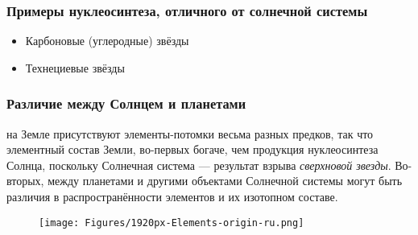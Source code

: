 \begin{frame}
\frametitle{Примеры нуклеосинтеза, отличного от солнечной системы}

\begin{itemize}
    \item Карбоновые (углеродные) звёзды
    \item Технециевые звёзды
\end{itemize}



\end{frame}

\begin{frame}
\frametitle{Различие между  Солнцем и планетами}
{\footnotesize
 на Земле присутствуют элементы-потомки весьма разных предков, так что элементный состав Земли, во-первых богаче, чем продукция нуклеосинтеза Солнца, поскольку Солнечная система --- результат взрыва \emph{сверхновой звезды}. 	Во-вторых, между планетами и другими объектами Солнечной системы могут быть различия в распространённости элементов и их изотопном составе.}
	\begin{figure}[ht] 
	\centering\small
	\texttt{[image: Figures/1920px-Elements-origin-ru.png]}
	\label{f:Nucleosynthesis_periodic_table}
\end{figure}

\end{frame}
